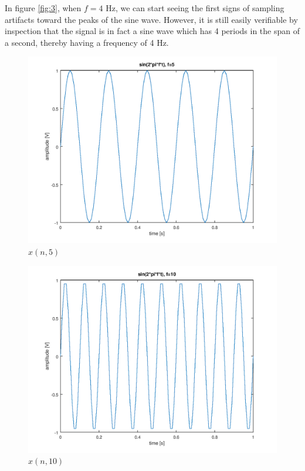 \documentclass[a4paper, 12pt]{report}
\begin{document}
			In figure \ref{fig:3}, when $f=4$ Hz, we can start seeing the first signs of sampling artifacts toward the peaks of the sine wave. However, it is still easily verifiable by inspection that the signal is in fact a sine wave which has 4 periods in the span of a second, thereby having a frequency of 4 Hz.

			\begin{figure}[H]
				\label{fig:4}
				\includegraphics[width=\textwidth]{img/1_4.png}
				\caption{$x(n, 5)$}
			\end{figure}

			\begin{figure}[H]
				\label{fig:5}
				\includegraphics[width=\textwidth]{img/1_5.png}
				\caption{$x(n, 10)$}
			\end{figure}
\end{document}

